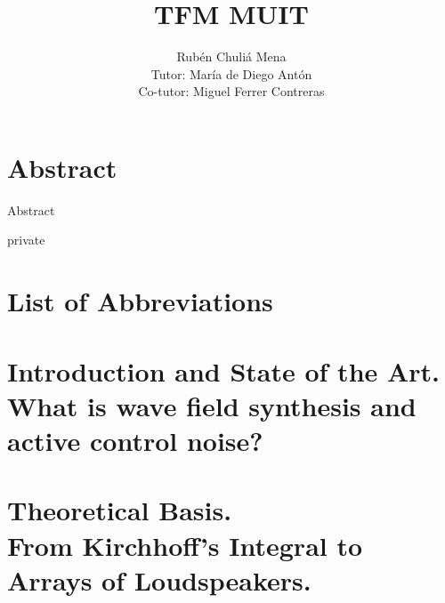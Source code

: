 \documentclass[11pt,a4paper]{report}
\providecommand\phantomsection{}
\begin{document}
\author{
	Rub\'{e}n Chuli\'{a} Mena \\
	Tutor: Mar\'ia de Diego Ant\'on \\
	Co-tutor: Miguel Ferrer Contreras
}
\title{TFM MUIT}
\date{}
\maketitle
{}

\phantomsection %
\tableofcontents

\newpage

\phantomsection
{}
\chapter*{Abstract}
Abstract

\newpage

\phantomsection
\listoffigures

\newpage

\begin{shownto}{private}
\phantomsection
{}
\chapter*{List of Abbreviations}

\end{shownto}

\newpage
\setcounter{page}{1}

\chapter[Introduction and State of the Art]{Introduction and State of the Art.\\What is wave field synthesis and active control noise?}



\chapter[Theoretical Basis]{Theoretical Basis.\\From Kirchhoff's Integral to Arrays of Loudspeakers.}\label{chapterWFStheory}

%
%
\end{document}
